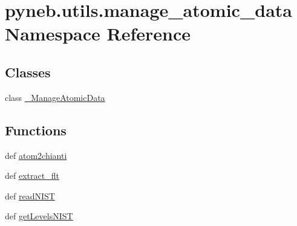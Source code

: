 \hypertarget{namespacepyneb_1_1utils_1_1manage__atomic__data}{\section{pyneb.\-utils.\-manage\-\_\-atomic\-\_\-data Namespace Reference}
\label{namespacepyneb_1_1utils_1_1manage__atomic__data}
}
\subsection*{Classes}
\begin{DoxyCompactItemize}
\item 
class \hyperlink{classpyneb_1_1utils_1_1manage__atomic__data_1_1___manage_atomic_data}{\-\_\-\-Manage\-Atomic\-Data}
\end{DoxyCompactItemize}
\subsection*{Functions}
\begin{DoxyCompactItemize}
\item 
def \hyperlink{namespacepyneb_1_1utils_1_1manage__atomic__data_a2c05deb31d8bc74727659c88846651a1}{atom2chianti}
\item 
def \hyperlink{namespacepyneb_1_1utils_1_1manage__atomic__data_afdff99c053c20f73c85c2f653a3e88cf}{extract\-\_\-flt}
\item 
def \hyperlink{namespacepyneb_1_1utils_1_1manage__atomic__data_a7cc94dc359981610066c8212bf4aed51}{read\-N\-I\-S\-T}
\item 
def \hyperlink{namespacepyneb_1_1utils_1_1manage__atomic__data_ad09376e8676854d44680ae14210b5589}{get\-Levels\-N\-I\-S\-T}
\end{DoxyCompactItemize}


